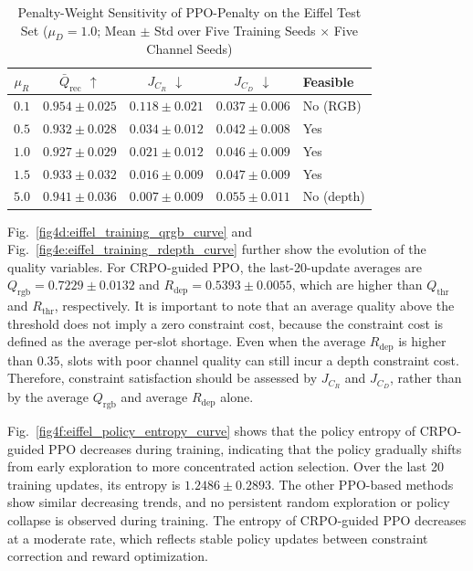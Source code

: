 \documentclass[journal]{IEEEtran}
\begin{document}
\begin{table}[t]
\centering
\caption{Penalty-Weight Sensitivity of PPO-Penalty on the Eiffel Test Set ($\mu_D=1.0$; Mean $\pm$ Std over Five Training Seeds $\times$ Five Channel Seeds)}
\label{tab:penalty_weight_sensitivity}
\footnotesize
\setlength{\tabcolsep}{4pt}
\renewcommand{\arraystretch}{1.08}
\begin{tabular}{c c c c l}
\hline
$\mu_R$ & $\bar{Q}_{\mathrm{rec}}$ $\uparrow$ & $J_{C_R}$ $\downarrow$ & $J_{C_D}$ $\downarrow$ & Feasible \\
\hline
$0.1$ & $0.954{\pm}0.025$ & $0.118{\pm}0.021$ & $0.037{\pm}0.006$ & No (RGB) \\
$0.5$ & $0.932{\pm}0.028$ & $0.034{\pm}0.012$ & $0.042{\pm}0.008$ & Yes \\
$1.0$ & $0.927{\pm}0.029$ & $0.021{\pm}0.012$ & $0.046{\pm}0.009$ & Yes \\
$1.5$ & $0.933{\pm}0.032$ & $0.016{\pm}0.009$ & $0.047{\pm}0.009$ & Yes \\
$5.0$ & $0.941{\pm}0.036$ & $0.007{\pm}0.009$ & $0.055{\pm}0.011$ & No (depth) \\
\hline
\end{tabular}
\end{table}

Fig.~\ref{fig4d:eiffel_training_qrgb_curve} and Fig.~\ref{fig4e:eiffel_training_rdepth_curve} further show the evolution of the quality variables. For CRPO-guided PPO, the last-20-update averages are $Q_{\mathrm{rgb}}=0.7229\pm0.0132$ and $R_{\mathrm{dep}}=0.5393\pm0.0055$, which are higher than $Q_{\mathrm{thr}}$ and $R_{\mathrm{thr}}$, respectively. It is important to note that an average quality above the threshold does not imply a zero constraint cost, because the constraint cost is defined as the average per-slot shortage. Even when the average $R_{\mathrm{dep}}$ is higher than $0.35$, slots with poor channel quality can still incur a depth constraint cost. Therefore, constraint satisfaction should be assessed by $J_{C_R}$ and $J_{C_D}$, rather than by the average $Q_{\mathrm{rgb}}$ and average $R_{\mathrm{dep}}$ alone.

Fig.~\ref{fig4f:eiffel_policy_entropy_curve} shows that the policy entropy of CRPO-guided PPO decreases during training, indicating that the policy gradually shifts from early exploration to more concentrated action selection. Over the last 20 training updates, its entropy is $1.2486\pm0.2893$. The other PPO-based methods show similar decreasing trends, and no persistent random exploration or policy collapse is observed during training. The entropy of CRPO-guided PPO decreases at a moderate rate, which reflects stable policy updates between constraint correction and reward optimization.
\end{document}
